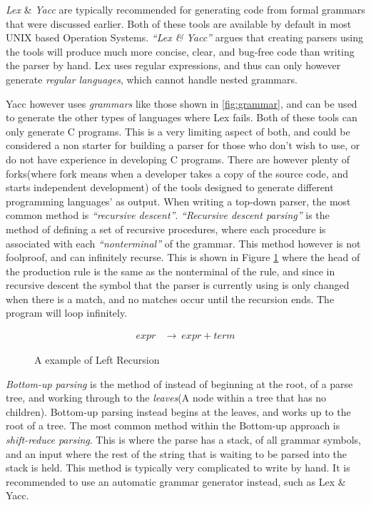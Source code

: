 \textit{Lex} \& \textit{Yacc} are typically recommended for generating code from formal grammars that were discussed earlier\cite{DragonBook}. Both of these tools are available by default in most UNIX based Operation Systems. \textit{``Lex \& Yacc''} argues that creating parsers using the tools will produce much more concise, clear, and bug-free code than writing the parser by hand\cite{LexYacc}. Lex uses regular expressions, and thus can only however generate \textit{regular languages}, which cannot handle nested grammars.

Yacc however uses \textit{grammars} like those shown in \ref{fig:grammar}, and can be used to generate the other types of languages where Lex fails. Both of these tools can only generate C programs. This is a very limiting aspect of both, and could be considered a non starter for building a parser for those who don't wish to use, or do not have experience in developing C programs. There are however plenty of forks(where fork means when a developer takes a copy of the source code, and starts independent development\cite{Fork}) of the tools designed to generate different programming languages' as output.
\newpage
When writing a top-down parser, the most common method is \textit{``recursive descent''}\cite{DragonBook}\cite{ParseTech}. \textit{``Recursive descent parsing''} is the method of defining a set of recursive procedures, where each procedure is associated with each \textit{``nonterminal''} of the grammar. This method however is not foolproof, and can infinitely recurse\cite{DragonBook}. This is shown in Figure \ref{fig:leftR} where the head of the production rule is the same as the nonterminal of the rule, and since in recursive descent the symbol that the parser is currently using is only changed when there is a match, and no matches occur until the recursion ends. The program will loop infinitely.

\begin{figure}[!hbtp]
    \begin{align*}
        expr &\rightarrow\ expr + term
    \end{align*}
    \caption{A example of Left Recursion\cite{DragonBook}}
    \label{fig:leftR}
\end{figure}
\textit{Bottom-up parsing} is the method of instead of beginning at the root, of a parse tree, and working through to the \textit{leaves}(A node within a tree that has no children). Bottom-up parsing instead begins at the leaves, and works up to the root of a tree. The most common method within the Bottom-up approach is \textit{shift-reduce parsing}. This is where the parse has a stack, of all grammar symbols, and an input where the rest of the string that is waiting to be parsed into the stack is held. This method is typically very complicated to write by hand. It is recommended to use an automatic grammar generator instead, such as Lex \& Yacc.


